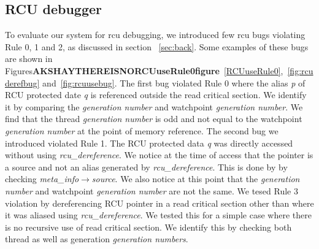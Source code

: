\subsection {RCU debugger}
To evaluate our system for rcu debugging, we introduced few rcu bugs violating
Rule 0, 1 and 2, as discussed in section ~\ref{sec:back}. Some examples of
these bugs are shown in Figures\textbf{AKSHAYTHEREISNORCUuseRule0figure}~\ref{RCUuseRule0},~\ref{fig:rcuderefbug} and~\ref{fig:rcuusebug}.
The first bug violated Rule 0 where the alias \emph{p} of RCU protected
date \emph{q} is referenced outside the read critical section. We
identify it by comparing the \emph{generation number} and watchpoint
\emph{generation number}. We find that the thread \emph{generation number}
is odd and not equal to the watchpoint \emph{generation number} at the
point of memory reference. The second bug we introduced violated Rule 1.
The RCU protected data \emph{q} was directly accessed without using
\emph{rcu\_dereference}. We notice at the time of access that the pointer
is a source and not an alias generated by \emph{rcu\_dereference}. This
is done by by checking \emph{meta\_info$\rightarrow$source}. We also notice
at this point that the \emph{generation number} and watchpoint \emph{generation number}
are not the same. We tesed Rule 3 violation by dereferencing RCU pointer in
a read critical section other than where it was aliased using \emph{rcu\_dereference}.
We tested this for a simple case where there is no recursive use of read critical
section. We identify this by checking both thread as well as generation
\emph{generation numbers}.


